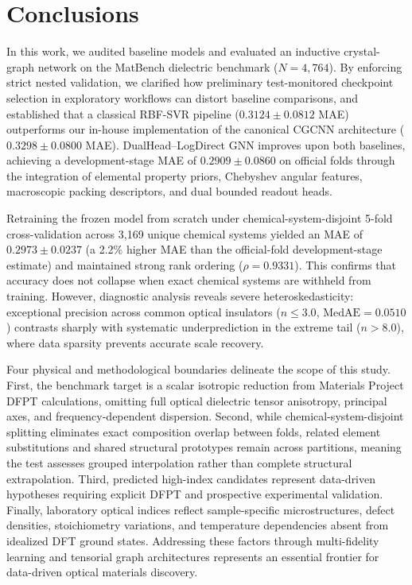 \documentclass[journal,article,submit,moreauthors,pdftex]{article}
\begin{document}
\section{Conclusions}
In this work, we audited baseline models and evaluated an inductive crystal-graph network on the MatBench dielectric benchmark ($N = 4{,}764$). By enforcing strict nested validation, we clarified how preliminary test-monitored checkpoint selection in exploratory workflows can distort baseline comparisons, and established that a classical RBF-SVR pipeline ($0.3124 \pm 0.0812$ MAE) outperforms our in-house implementation of the canonical CGCNN architecture ($0.3298 \pm 0.0800$ MAE). DualHead--LogDirect GNN improves upon both baselines, achieving a development-stage MAE of $0.2909 \pm 0.0860$ on official folds through the integration of elemental property priors, Chebyshev angular features, macroscopic packing descriptors, and dual bounded readout heads.

Retraining the frozen model from scratch under chemical-system-disjoint 5-fold cross-validation across 3,169 unique chemical systems yielded an MAE of $0.2973 \pm 0.0237$ (a 2.2\% higher MAE than the official-fold development-stage estimate) and maintained strong rank ordering ($\rho = 0.9331$). This confirms that accuracy does not collapse when exact chemical systems are withheld from training. However, diagnostic analysis reveals severe heteroskedasticity: exceptional precision across common optical insulators ($n \le 3.0$, $\text{MedAE} = 0.0510$) contrasts sharply with systematic underprediction in the extreme tail ($n > 8.0$), where data sparsity prevents accurate scale recovery.

Four physical and methodological boundaries delineate the scope of this study. First, the benchmark target is a scalar isotropic reduction from Materials Project DFPT calculations, omitting full optical dielectric tensor anisotropy, principal axes, and frequency-dependent dispersion. Second, while chemical-system-disjoint splitting eliminates exact composition overlap between folds, related element substitutions and shared structural prototypes remain across partitions, meaning the test assesses grouped interpolation rather than complete structural extrapolation. Third, predicted high-index candidates represent data-driven hypotheses requiring explicit DFPT and prospective experimental validation. Finally, laboratory optical indices reflect sample-specific microstructures, defect densities, stoichiometry variations, and temperature dependencies absent from idealized DFT ground states. Addressing these factors through multi-fidelity learning and tensorial graph architectures represents an essential frontier for data-driven optical materials discovery.
\end{document}
